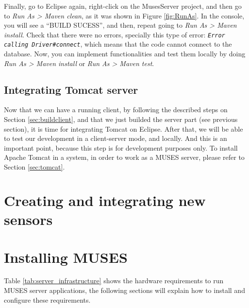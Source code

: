 \documentclass[a4paper,11pt]{book}
\begin{document}
Finally, go to Eclipse again, right-click on the MusesServer project, and then go to \textit{Run As > Maven clean}, as it was shown in Figure \ref{fig:RunAs}. In the console, you will see a ``BUILD SUCESS'', and then, repeat going to \textit{Run As > Maven install}. Check that there were no errors, specially this type of error: \texttt{\textit{Error calling Driver\#connect}}, which means that the code cannot connect to the database. Now, you can implement functionalities and test them locally by doing \textit{Run As > Maven install} or \textit{Run As > Maven test}.

\section{Integrating Tomcat server}
\label{sec:eclipsetomcat}

Now that we can have a running client, by following the described steps on Section \ref{sec:buildclient}, and that we just builded the server part (see previous section), it is time for integrating Tomcat on Eclipse. After that, we will be able to test our development in a client-server mode, and locally. And this is an important point, because this step is for development purposes only. To install Apache Tomcat in a system, in order to work as a MUSES server, please refer to Section \ref{sec:tomcat}.



\chapter{Creating and integrating new sensors}
\label{ch:sensors}


\chapter{Installing MUSES}
\label{ch:installmuses}

Table \ref{tab:server_infrastructure} shows the hardware requirements to run MUSES server applications, the following sections will explain how to install and configure these requirements.
\end{document}
